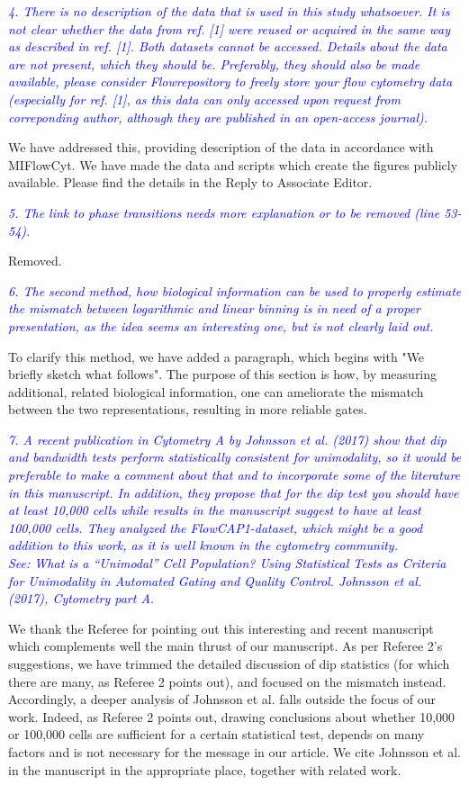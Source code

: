 \documentclass[letter,11pt,draft]{article}
\newcommand{\re}[1]{\emph{\textcolor{blue}{#1}}}
\begin{document}
\re{4. There is no description of the data that is used in this study whatsoever. It is not clear whether the data from ref. [1] were reused or acquired in the same way as described in ref. [1]. Both datasets cannot be accessed. Details about the data are not present, which they should be. Preferably, they should also be made available, please consider Flowrepository to freely store your flow cytometry data (especially for ref. [1], as this data can only accessed upon request from correponding author, although they are published in an open-access journal).}

\smallskip
We have addressed this, providing description of the data in accordance with MIFlowCyt. We have made the data and scripts which create the figures publicly available. Please find the details in the Reply to Associate Editor.

\re{5. The link to phase transitions needs more explanation or to be removed (line 53-54).}

\smallskip
Removed.

\re{6. The second method, how biological information can be used to properly estimate the mismatch between logarithmic and linear binning is in need of a proper presentation, as the idea seems an interesting one, but is not clearly laid out.}

\smallskip
To clarify this method, we have added a paragraph, which begins with "We briefly sketch what follows". The purpose of this section is how, by measuring additional, related biological information, one can ameliorate the mismatch between the two representations, resulting in more reliable gates. 

\re{7. A recent publication in Cytometry A by Johnsson et al. (2017) show that dip and bandwidth tests perform statistically consistent for unimodality, so it would be preferable to make a comment about that and to incorporate some of the literature in this manuscript. In addition, they propose that for the dip test you should have at least 10,000 cells while results in the manuscript suggest to have at least 100,000 cells. They analyzed the FlowCAP1-dataset, which might be a good addition to this work, as it is well known in the cytometry community.}
\\ 
\re{See: What is a “Unimodal” Cell Population? Using Statistical Tests as Criteria for Unimodality in Automated Gating and Quality Control. Johnsson et al. (2017), Cytometry part A.}

\smallskip
We thank the Referee for pointing out this interesting and recent manuscript which complements well the main thrust of our manuscript. As per Referee 2's suggestions, we have trimmed the detailed discussion of dip statistics (for which there are many, as Referee 2 points out), and focused on the mismatch instead. Accordingly, a deeper analysis of Johnsson et al. falls outside the focus of our work. Indeed, as Referee 2 points out, drawing conclusions about whether 10,000 or 100,000 cells are sufficient for a certain statistical test, depends on many factors and is not necessary for the message in our article. We cite Johnsson et al. in the manuscript in the appropriate place, together with related work. 
\end{document}
